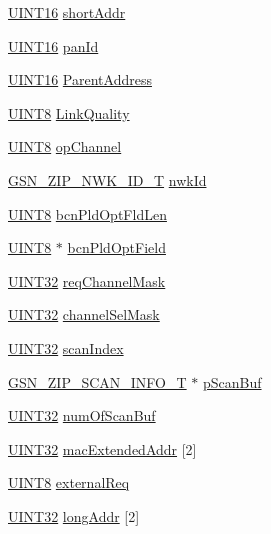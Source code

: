 \begin{DoxyCompactItemize}
\item 
\hyperlink{a00660_ga09f1a1fb2293e33483cc8d44aefb1eb1}{UINT16} \hyperlink{a00440_a9b19e8e3387061f7498579b37cdbabdf}{shortAddr}
\item 
\hyperlink{a00660_ga09f1a1fb2293e33483cc8d44aefb1eb1}{UINT16} \hyperlink{a00440_a6581a07c1278bb253870b72dc00d386c}{panId}
\item 
\hyperlink{a00660_ga09f1a1fb2293e33483cc8d44aefb1eb1}{UINT16} \hyperlink{a00440_ab741d6aa310525ebb0f9e4b49f320697}{ParentAddress}
\item 
\hyperlink{a00660_gab27e9918b538ce9d8ca692479b375b6a}{UINT8} \hyperlink{a00440_a0d0a983cfc03a9ab24197360ddad6dfb}{LinkQuality}
\item 
\hyperlink{a00660_gab27e9918b538ce9d8ca692479b375b6a}{UINT8} \hyperlink{a00440_ace13daabd3fb488dad3214e143d79cf0}{opChannel}
\item 
\hyperlink{a00441}{GSN\_\-ZIP\_\-NWK\_\-ID\_\-T} \hyperlink{a00440_aa09adf9d6455e0d08084e30083a043cd}{nwkId}
\item 
\hyperlink{a00660_gab27e9918b538ce9d8ca692479b375b6a}{UINT8} \hyperlink{a00440_a4dbf679669c21dfe3cde14a52d6493ba}{bcnPldOptFldLen}
\item 
\hyperlink{a00660_gab27e9918b538ce9d8ca692479b375b6a}{UINT8} $\ast$ \hyperlink{a00440_a84b867442a9df3ae3fd28cee436846ed}{bcnPldOptField}
\item 
\hyperlink{a00660_gae1e6edbbc26d6fbc71a90190d0266018}{UINT32} \hyperlink{a00440_acf6e868d8fc257d3844bc6e9a6e8608f}{reqChannelMask}
\item 
\hyperlink{a00660_gae1e6edbbc26d6fbc71a90190d0266018}{UINT32} \hyperlink{a00440_a7d5d0df3692ac043cf707cf61b5efe85}{channelSelMask}
\item 
\hyperlink{a00660_gae1e6edbbc26d6fbc71a90190d0266018}{UINT32} \hyperlink{a00440_a3524862c4c0985e934b9fa8c1dadd475}{scanIndex}
\item 
\hyperlink{a00442}{GSN\_\-ZIP\_\-SCAN\_\-INFO\_\-T} $\ast$ \hyperlink{a00440_aa3af50125796e52b0890b911f8413313}{pScanBuf}
\item 
\hyperlink{a00660_gae1e6edbbc26d6fbc71a90190d0266018}{UINT32} \hyperlink{a00440_af6f0a9ed6e907cc254f87be7ffb7cd4c}{numOfScanBuf}
\item 
\hyperlink{a00660_gae1e6edbbc26d6fbc71a90190d0266018}{UINT32} \hyperlink{a00440_acdbdc3eb6e942e1f888ea5147db2bcd6}{macExtendedAddr} \mbox{[}2\mbox{]}
\item 
\hyperlink{a00660_gab27e9918b538ce9d8ca692479b375b6a}{UINT8} \hyperlink{a00440_a918d9ee8150c76110c706278f1d701d6}{externalReq}
\item 
\hyperlink{a00660_gae1e6edbbc26d6fbc71a90190d0266018}{UINT32} \hyperlink{a00440_a8ab771887ab75e0ebb14c47d0ab1bca4}{longAddr} \mbox{[}2\mbox{]}
\end{DoxyCompactItemize}


